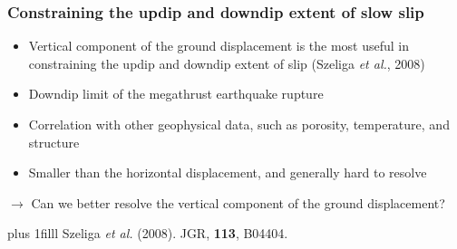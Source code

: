\documentclass{beamer}
\newcommand{\btVFill}{\vskip0pt plus 1filll}
\begin{document}
%
%
%
%
%

	\begin{frame}
		\frametitle{Constraining the updip and downdip extent of slow slip}
		\begin{itemize}
			\item Vertical component of the ground displacement is the most useful in constraining the updip and downdip extent of slip (Szeliga \textit{et al.}, 2008)
			\item Downdip limit of the megathrust earthquake rupture
			\item Correlation with other geophysical data, such as porosity, temperature, and structure
			\item Smaller than the horizontal displacement, and generally hard to resolve
		\end{itemize}
		\begin{block}{}
			$\rightarrow$ Can we better resolve the vertical component of the ground displacement?
		\end{block}
		\btVFill
\tiny{Szeliga \textit{et al.} (2008). JGR, \textbf{113}, B04404.}
	\end{frame}

\end{document}
